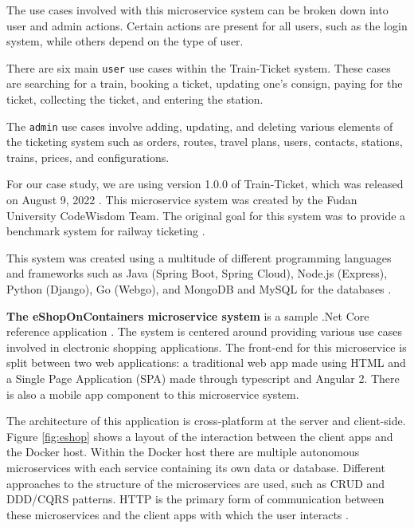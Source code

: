 The use cases involved with this microservice system can be broken down into user and admin actions. Certain actions are present for all users, such as the login system, while others depend on the type of user. 

There are six main \texttt{user} use cases within the Train-Ticket system. These cases are searching for a train, booking a ticket, updating one's consign, paying for the ticket, collecting the ticket, and entering the station. 

The \texttt{admin} use cases involve adding, updating, and deleting various elements of the ticketing system such as orders, routes, travel plans, users, contacts, stations, trains, prices, and configurations.

For our case study, we are using version 1.0.0 of Train-Ticket, which was released on August 9, 2022 \cite{trainticket}. This microservice system was created by the Fudan University CodeWisdom Team. The original goal for this system was to provide a benchmark system for railway ticketing \cite{zhou2018benchmarking}.

This system was created using a multitude of different programming languages and frameworks such as Java (Spring Boot, Spring Cloud), Node.js (Express), Python (Django), Go (Webgo), and MongoDB and MySQL for the databases \cite{trainticket}.


{\bf The eShopOnContainers microservice system} is a sample .Net Core reference application \cite{eshop}. The system is centered around providing various use cases involved in electronic shopping applications. The front-end for this microservice is split between two web applications: a traditional web app made using HTML and a Single Page Application (SPA) made through typescript and Angular 2. There is also a mobile app component to this microservice system.

The architecture of this application is cross-platform at the server and client-side. Figure \ref{fig:eshop} shows a layout of the interaction between the client apps and the Docker host. Within the Docker host there are multiple autonomous microservices with each service containing its own data or database. Different approaches to the structure of the microservices are used, such as CRUD and DDD/CQRS patterns. HTTP is the primary form of communication between these microservices and the client apps with which the user interacts \cite{eshop}. 

